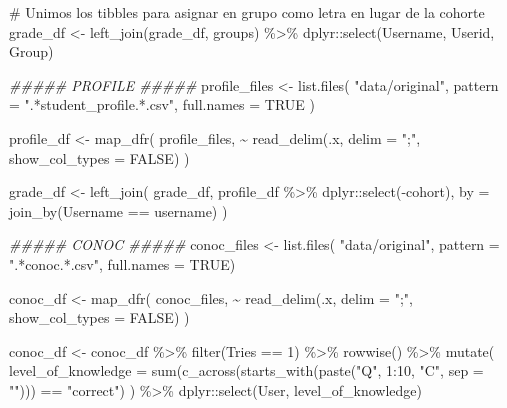 \documentclass[
  12pt,
  a4paper,
  extrafontsizes,
  onecolumn,
  openright]{memoir}
\newenvironment{Shaded}{\begin{snugshade}}{\end{snugshade}}
\newcommand{\AttributeTok}[1]{\textcolor[rgb]{0.40,0.45,0.13}{#1}}
\newcommand{\CommentTok}[1]{\textcolor[rgb]{0.37,0.37,0.37}{#1}}
\newcommand{\ConstantTok}[1]{\textcolor[rgb]{0.56,0.35,0.01}{#1}}
\newcommand{\DecValTok}[1]{\textcolor[rgb]{0.68,0.00,0.00}{#1}}
\newcommand{\DocumentationTok}[1]{\textcolor[rgb]{0.37,0.37,0.37}{\textit{#1}}}
\newcommand{\FunctionTok}[1]{\textcolor[rgb]{0.28,0.35,0.67}{#1}}
\newcommand{\NormalTok}[1]{\textcolor[rgb]{0.00,0.23,0.31}{#1}}
\newcommand{\OtherTok}[1]{\textcolor[rgb]{0.00,0.23,0.31}{#1}}
\newcommand{\SpecialCharTok}[1]{\textcolor[rgb]{0.37,0.37,0.37}{#1}}
\newcommand{\StringTok}[1]{\textcolor[rgb]{0.13,0.47,0.30}{#1}}
\begin{document}
\begin{Shaded}
\begin{Highlighting}[]
\CommentTok{\# Unimos los tibbles para asignar en grupo como letra en lugar de la cohorte}
\NormalTok{grade\_df }\OtherTok{\textless{}{-}} \FunctionTok{left\_join}\NormalTok{(grade\_df, groups) }\SpecialCharTok{\%\textgreater{}\%}\NormalTok{ dplyr}\SpecialCharTok{::}\FunctionTok{select}\NormalTok{(Username, Userid, Group)}

\DocumentationTok{\#\#\#\#\# PROFILE \#\#\#\#\#}
\NormalTok{profile\_files }\OtherTok{\textless{}{-}} \FunctionTok{list.files}\NormalTok{(}
    \StringTok{"data/original"}\NormalTok{, }\AttributeTok{pattern =} \StringTok{".*student\_profile.*.csv"}\NormalTok{, }\AttributeTok{full.names =} \ConstantTok{TRUE}
\NormalTok{)}

\NormalTok{profile\_df }\OtherTok{\textless{}{-}} \FunctionTok{map\_dfr}\NormalTok{(}
\NormalTok{    profile\_files, }\SpecialCharTok{\textasciitilde{}} \FunctionTok{read\_delim}\NormalTok{(.x, }\AttributeTok{delim =} \StringTok{";"}\NormalTok{, }\AttributeTok{show\_col\_types =} \ConstantTok{FALSE}\NormalTok{)}
\NormalTok{)}

\NormalTok{grade\_df }\OtherTok{\textless{}{-}} \FunctionTok{left\_join}\NormalTok{(}
\NormalTok{    grade\_df, profile\_df }\SpecialCharTok{\%\textgreater{}\%}\NormalTok{ dplyr}\SpecialCharTok{::}\FunctionTok{select}\NormalTok{(}\SpecialCharTok{{-}}\NormalTok{cohort), }\AttributeTok{by =} \FunctionTok{join\_by}\NormalTok{(Username }\SpecialCharTok{==}\NormalTok{ username)}
\NormalTok{)}


\DocumentationTok{\#\#\#\#\# CONOC \#\#\#\#\#}
\NormalTok{conoc\_files }\OtherTok{\textless{}{-}} \FunctionTok{list.files}\NormalTok{(}
    \StringTok{"data/original"}\NormalTok{, }\AttributeTok{pattern =} \StringTok{".*conoc.*.csv"}\NormalTok{, }\AttributeTok{full.names =} \ConstantTok{TRUE}\NormalTok{)}

\NormalTok{conoc\_df }\OtherTok{\textless{}{-}} \FunctionTok{map\_dfr}\NormalTok{(}
\NormalTok{    conoc\_files, }\SpecialCharTok{\textasciitilde{}} \FunctionTok{read\_delim}\NormalTok{(.x, }\AttributeTok{delim =} \StringTok{";"}\NormalTok{, }\AttributeTok{show\_col\_types =} \ConstantTok{FALSE}\NormalTok{)}
\NormalTok{)}

\NormalTok{conoc\_df }\OtherTok{\textless{}{-}}\NormalTok{ conoc\_df }\SpecialCharTok{\%\textgreater{}\%}
    \FunctionTok{filter}\NormalTok{(Tries }\SpecialCharTok{==} \DecValTok{1}\NormalTok{) }\SpecialCharTok{\%\textgreater{}\%}
    \FunctionTok{rowwise}\NormalTok{() }\SpecialCharTok{\%\textgreater{}\%}
    \FunctionTok{mutate}\NormalTok{(}
        \AttributeTok{level\_of\_knowledge =} 
            \FunctionTok{sum}\NormalTok{(}\FunctionTok{c\_across}\NormalTok{(}\FunctionTok{starts\_with}\NormalTok{(}\FunctionTok{paste}\NormalTok{(}\StringTok{"Q"}\NormalTok{, }\DecValTok{1}\SpecialCharTok{:}\DecValTok{10}\NormalTok{, }\StringTok{"C"}\NormalTok{, }\AttributeTok{sep =} \StringTok{""}\NormalTok{))) }\SpecialCharTok{==} \StringTok{"correct"}\NormalTok{)}
\NormalTok{    ) }\SpecialCharTok{\%\textgreater{}\%}
\NormalTok{    dplyr}\SpecialCharTok{::}\FunctionTok{select}\NormalTok{(User, level\_of\_knowledge)}


\end{Highlighting}
\end{Shaded}
\end{document}
